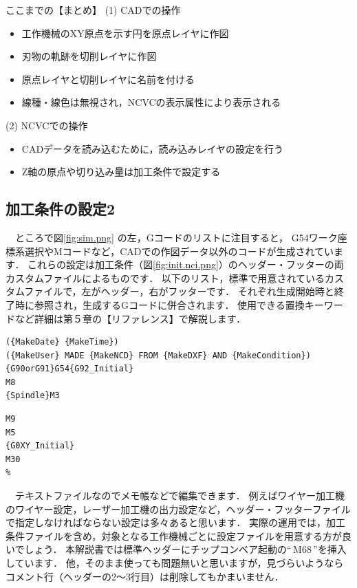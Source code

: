 \vspace*{2zh}
\begin{itembox}[l]{ここまでの【まとめ】}
(1) CADでの操作
\begin{itemize}
\item 工作機械のXY原点を示す円を原点レイヤに作図
\item 刃物の軌跡を切削レイヤに作図
\item 原点レイヤと切削レイヤに名前を付ける
\item 線種・線色は無視され，NCVCの表示属性により表示される
\end{itemize}
(2) NCVCでの操作
\begin{itemize}
\item CADデータを読み込むために，読み込みレイヤの設定を行う
\item Z軸の原点や切り込み量は加工条件で設定する
\end{itemize}
\end{itembox}

\subsection{加工条件の設定2}

　ところで図\ref{fig:sim.png} の左，Gコードのリストに注目すると，
G54ワーク座標系選択やMコードなど，CADでの作図データ以外のコードが生成されています．
これらの設定は加工条件（図\ref{fig:init.nci.png}）のヘッダー・フッターの両カスタムファイルによるものです．
以下のリスト，標準で用意されているカスタムファイルで，左がヘッダー，右がフッターです．
それぞれ生成開始時と終了時に参照され，生成するGコードに併合されます．
使用できる置換キーワードなど詳細は第５章の【リファレンス】で解説します．

\begin{minipage}[t]{0.75\textwidth}
\begin{lstlisting}[caption=Header.txt,numbers=none,label=lst:header.txt]
%
({MakeDate} {MakeTime})
({MakeUser} MADE {MakeNCD} FROM {MakeDXF} AND {MakeCondition})
{G90orG91}G54{G92_Initial}
M8
{Spindle}M3
\end{lstlisting}
\end{minipage}
\begin{minipage}[t]{0.25\textwidth}
\begin{lstlisting}[caption=Footer.txt,numbers=none,label=lst:footer.txt]
M9
M5
{G0XY_Initial}
M30
%
\end{lstlisting}
\end{minipage}

　テキストファイルなのでメモ帳などで編集できます．
例えばワイヤー加工機のワイヤー設定，レーザー加工機の出力設定など，ヘッダー・フッターファイルで指定しなければならない設定は多々あると思います．
実際の運用では，加工条件ファイルを含め，対象となる工作機械ごとに設定ファイルを用意する方が良いでしょう．
本解説書では標準ヘッダーにチップコンベア起動の``\,M68\,''を挿入しています．
他，そのまま使っても問題無いと思いますが，見づらいようならコメント行（ヘッダーの2～3行目）は削除してもかまいません．


